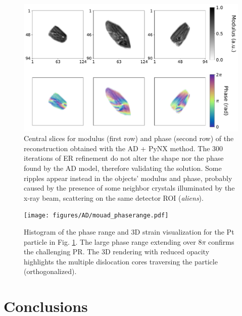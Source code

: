 \begin{figure}[H]
  \centering
  \includegraphics[width=\textwidth]{figures/AD/ad_pynx_mouad.pdf}
  \caption{Central slices for modulus (first row) and phase (second row) of the reconstruction obtained with the AD + PyNX method.
  The 300 iterations of ER refinement do not alter the shape nor the phase found by the AD model, therefore validating the solution.
  Some ripples appear instead in the objects' modulus and phase, probably caused by the presence of some neighbor crystals illuminated by the 
  x-ray beam, scattering on the same detector ROI (\textit{aliens}). }
  \label{fig:adpynx_mouad}
\end{figure}

\begin{figure}[H]
  \centering
  \texttt{[image: figures/AD/mouad\_phaserange.pdf]}
  \caption{Histogram of the phase range and 3D strain visualization for the Pt particle in Fig. \ref{fig:adpynx_mouad}.
  The large phase range extending over $8\pi$ confirms the challenging PR. The 3D rendering with reduced opacity highlights 
  the multiple dislocation cores traversing the particle (orthogonalized).  }
  \label{fig:mouad_phaserange}
\end{figure}


\section{Conclusions}

